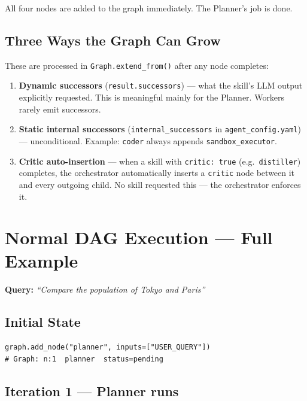 \documentclass[12pt,a4paper]{article}
\begin{document}
All four nodes are added to the graph immediately. The Planner's job is done.

\subsection{Three Ways the Graph Can Grow}

These are processed in \texttt{Graph.extend\_from()} after any node completes:

\begin{enumerate}
  \item \textbf{Dynamic successors} (\texttt{result.successors}) — what the
    skill's LLM output explicitly requested. This is meaningful mainly for the
    Planner. Workers rarely emit successors.

  \item \textbf{Static internal successors} (\texttt{internal\_successors} in
    \texttt{agent\_config.yaml}) — unconditional. Example: \texttt{coder} always
    appends \texttt{sandbox\_executor}.

  \item \textbf{Critic auto-insertion} — when a skill with \texttt{critic: true}
    (e.g.\ \texttt{distiller}) completes, the orchestrator automatically inserts
    a \texttt{critic} node between it and every outgoing child. No skill
    requested this — the orchestrator enforces it.
\end{enumerate}

\section{Normal DAG Execution — Full Example}

\textbf{Query:} \textit{``Compare the population of Tokyo and Paris''}

\subsection{Initial State}

\begin{lstlisting}[style=pycode]
graph.add_node("planner", inputs=["USER_QUERY"])
# Graph: n:1  planner  status=pending
\end{lstlisting}

\subsection{Iteration 1 — Planner runs}
\end{document}
